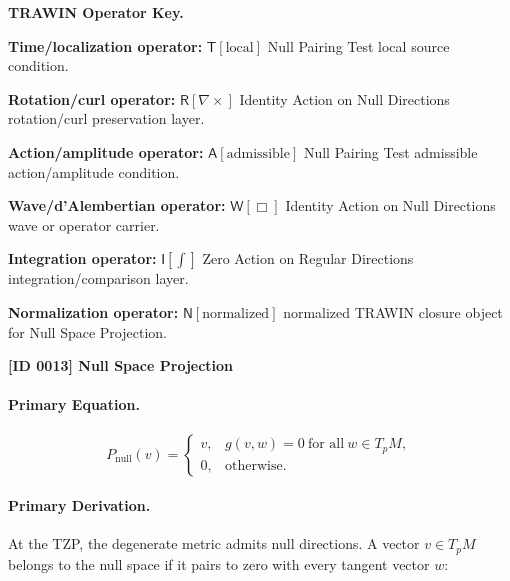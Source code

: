 \par\vspace{0.45\baselineskip}
\noindent\begin{minipage}[t]{\linewidth}
\begingroup
\small
\raggedright
\textbf{TRAWIN Operator Key.}\par
\noindent\textbf{Time/localization operator:} $\mathsf{T}\!\left[\mathrm{local}\right]$ Null Pairing Test local source condition.\par
\noindent\textbf{Rotation/curl operator:} $\mathsf{R}\!\left[\nabla\times\right]$ Identity Action on Null Directions rotation/curl preservation layer.\par
\noindent\textbf{Action/amplitude operator:} $\mathsf{A}\!\left[\mathrm{admissible}\right]$ Null Pairing Test admissible action/amplitude condition.\par
\noindent\textbf{Wave/d'Alembertian operator:} $\mathsf{W}\!\left[\Box\right]$ Identity Action on Null Directions wave or operator carrier.\par
\noindent\textbf{Integration operator:} $\mathsf{I}\!\left[\int\right]$ Zero Action on Regular Directions integration/comparison layer.\par
\noindent\textbf{Normalization operator:} $\mathsf{N}\!\left[\mathrm{normalized}\right]$ normalized TRAWIN closure object for Null Space Projection.\par
\endgroup
\end{minipage}

\clearpage
\noindent\textbf{[ID 0013] Null Space Projection}\par
\vspace{0.35em}
\paragraph{Primary Equation.}
\begin{equation}
P_{\mathrm{null}}(v)
=
\begin{cases}
v, & g(v,w)=0\ \text{for all}\ w\in T_pM,\\
0, & \text{otherwise}.
\end{cases}
\end{equation}

\paragraph{Primary Derivation.}
At the TZP, the degenerate metric admits null directions.  
A vector $v\in T_pM$ belongs to the null space if it pairs to zero with every tangent vector $w$:

